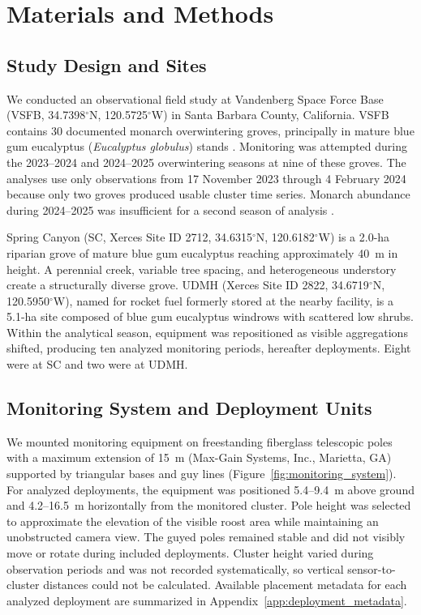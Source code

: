 \documentclass[insects,article,submit,pdftex,moreauthors]{Definitions/mdpi}
\begin{document}
\section{Materials and Methods}

\subsection{Study Design and Sites}

We conducted an observational field study at Vandenberg Space Force Base (VSFB, 34.7398$^{\circ}$N, 120.5725$^{\circ}$W) in Santa Barbara County, California. VSFB contains 30 documented monarch overwintering groves, principally in mature blue gum eucalyptus (\textit{Eucalyptus globulus}) stands \cite{xercessocietyWesternMonarchThanksgiving2025}. Monitoring was attempted during the 2023--2024 and 2024--2025 overwintering seasons at nine of these groves. The analyses use only observations from 17 November 2023 through 4 February 2024 because only two groves produced usable cluster time series. Monarch abundance during 2024--2025 was insufficient for a second season of analysis \cite{xercessocietyWesternMonarchThanksgiving2025}.

Spring Canyon (SC, Xerces Site ID 2712, 34.6315$^{\circ}$N, 120.6182$^{\circ}$W) is a 2.0-ha riparian grove of mature blue gum eucalyptus reaching approximately 40~m in height. A perennial creek, variable tree spacing, and heterogeneous understory create a structurally diverse grove. UDMH (Xerces Site ID 2822, 34.6719$^{\circ}$N, 120.5950$^{\circ}$W), named for rocket fuel formerly stored at the nearby facility, is a 5.1-ha site composed of blue gum eucalyptus windrows with scattered low shrubs. Within the analytical season, equipment was repositioned as visible aggregations shifted, producing ten analyzed monitoring periods, hereafter deployments. Eight were at SC and two were at UDMH.

\subsection{Monitoring System and Deployment Units}

We mounted monitoring equipment on freestanding fiberglass telescopic poles with a maximum extension of 15~m (Max-Gain Systems, Inc., Marietta, GA) supported by triangular bases and guy lines (Figure~\ref{fig:monitoring_system}). For analyzed deployments, the equipment was positioned 5.4--9.4~m above ground and 4.2--16.5~m horizontally from the monitored cluster. Pole height was selected to approximate the elevation of the visible roost area while maintaining an unobstructed camera view. The guyed poles remained stable and did not visibly move or rotate during included deployments. Cluster height varied during observation periods and was not recorded systematically, so vertical sensor-to-cluster distances could not be calculated. Available placement metadata for each analyzed deployment are summarized in Appendix~\ref{app:deployment_metadata}.
\end{document}
